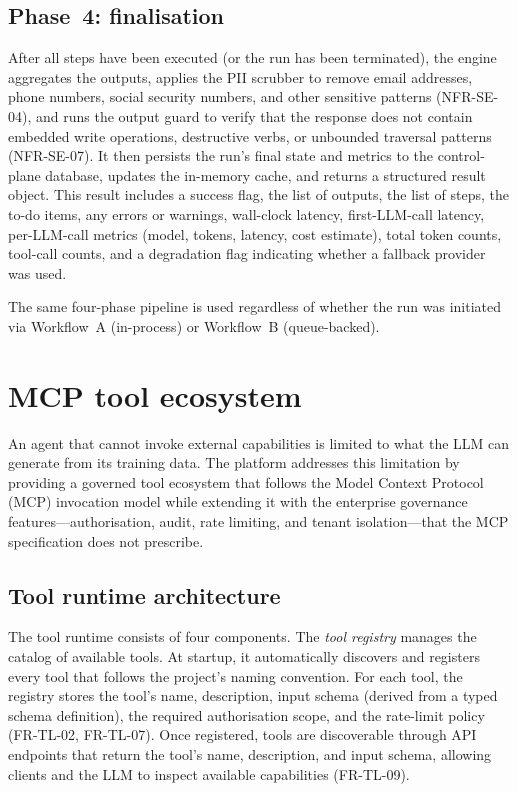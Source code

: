 \documentclass[a4paper,noexaminfo]{sapthesis}
\begin{document}
\subsection{Phase~4: finalisation}

After all steps have been executed (or the run has been terminated), the
engine aggregates the outputs, applies the PII scrubber to remove email
addresses, phone numbers, social security numbers, and other sensitive
patterns (NFR-SE-04), and runs the output guard to verify that the
response does not contain embedded write operations, destructive verbs, or
unbounded traversal patterns (NFR-SE-07).  It then persists the run's
final state and metrics to the control-plane database, updates the
in-memory cache, and returns a structured result object.  This result
includes a success flag, the list of outputs, the list of steps, the
to-do items, any errors or warnings, wall-clock latency, first-LLM-call
latency, per-LLM-call metrics (model, tokens, latency, cost estimate),
total token counts, tool-call counts, and a degradation flag indicating
whether a fallback provider was used.

The same four-phase pipeline is used regardless of whether the run was
initiated via Workflow~A (in-process) or Workflow~B (queue-backed).


\section{MCP tool ecosystem}
\label{sec:mcp-tools}

An agent that cannot invoke external capabilities is limited to what the
LLM can generate from its training data.  The platform addresses this
limitation by providing a governed tool ecosystem that follows the Model
Context Protocol (MCP) invocation model while extending it with the
enterprise governance features---authorisation, audit, rate limiting, and
tenant isolation---that the MCP specification does not prescribe.

\subsection{Tool runtime architecture}

The tool runtime consists of four components.  The \emph{tool registry}
manages the catalog of available tools.  At startup, it
automatically discovers and registers every tool that follows the
project's naming convention.  For each tool, the registry stores the tool's name,
description, input schema (derived from a typed schema definition), the
required authorisation scope, and the rate-limit policy (FR-TL-02,
FR-TL-07).  Once registered, tools are discoverable through API endpoints
that return the tool's name, description, and input schema, allowing
clients and the LLM to inspect available capabilities (FR-TL-09).
\end{document}
